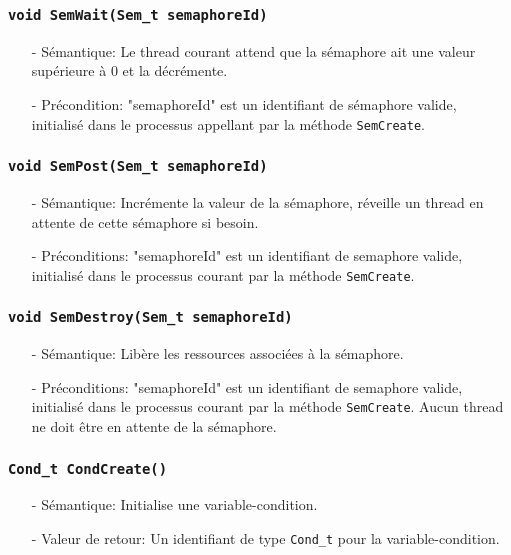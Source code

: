 \documentclass[11pt]{article}
\theoremstyle{definition}
\theoremstyle{definition}
\begin{document}
\subsubsection{\texttt{void SemWait(Sem\_t semaphoreId)}}
\begin{itemize}
\item[-]Sémantique: Le thread courant attend que la sémaphore ait une valeur supérieure à $0$
  et la décrémente.
\item[-]Précondition: "semaphoreId" est un identifiant de sémaphore valide, initialisé dans le processus
  appellant par la méthode \texttt{SemCreate}.
\end{itemize}

\subsubsection{\texttt{void SemPost(Sem\_t semaphoreId)}}
\begin{itemize}
\item[-]Sémantique: Incrémente la valeur de la sémaphore, réveille un thread en attente de cette sémaphore
  si besoin.
\item[-]Préconditions: "semaphoreId" est un identifiant de semaphore valide, initialisé dans le processus
  courant par la méthode \texttt{SemCreate}.
\end{itemize}

\subsubsection{\texttt{void SemDestroy(Sem\_t semaphoreId)}}
\begin{itemize}
\item[-]Sémantique: Libère les ressources associées à la sémaphore.
\item[-]Préconditions: "semaphoreId" est un identifiant de semaphore valide, initialisé dans le processus
  courant par la méthode \texttt{SemCreate}. Aucun thread ne doit être en attente de la sémaphore.
\end{itemize}

\subsubsection{\texttt{Cond\_t CondCreate()}}
\begin{itemize}
\item[-]Sémantique: Initialise une variable-condition.
\item[-]Valeur de retour: Un identifiant de type \texttt{Cond\_t} pour la variable-condition.
\end{itemize}
\end{document}
